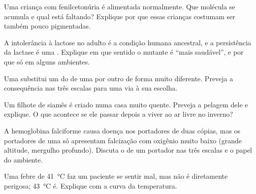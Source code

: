 \begin{exercise}[$\star\star$]\label{exo:g11:enzymes-and-phenotype:8}
Uma criança com fenilcetonúria é alimentada normalmente. Que molécula
se acumula e qual está faltando? Explique por que essas crianças
costumam ser também pouco pigmentadas.
\end{exercise}

\begin{exercise}[$\star\star$]\label{exo:g11:enzymes-and-phenotype:9}
A intolerância à lactose no adulto é a condição humana ancestral, e a
persistência da lactase é uma . Explique em que sentido o
 mutante é ``mais saudável'', e por que só em alguns ambientes.
\end{exercise}

\begin{exercise}[$\star\star$]\label{exo:g11:enzymes-and-phenotype:10}
Uma  substitui um  do  de uma  por
outro de forma muito diferente. Preveja a consequência nas três escalas
para uma via à sua escolha.
\end{exercise}

\begin{exercise}[$\star\star$]\label{exo:g11:enzymes-and-phenotype:11}
Um filhote de siamês é criado numa casa muito quente. Preveja a
pelagem dele e explique. O que acontece se ele passar depois a viver
ao ar livre no inverno?
\end{exercise}

\begin{exercise}[$\star\star\star$]\label{exo:g11:enzymes-and-phenotype:12}
A hemoglobina falciforme causa doença nos portadores de duas cópias,
mas os portadores de uma só apresentam falcização com oxigênio muito
baixo (grande altitude, mergulho profundo). Discuta o  de um
portador nas três escalas e o papel do ambiente.
\end{exercise}

\begin{exercise}[$\star\star\star$]\label{exo:g11:enzymes-and-phenotype:13}
Uma febre de \qty{41}{\celsius} faz um paciente se sentir mal, mas não
é diretamente perigosa; \qty{43}{\celsius} é. Explique com a curva da
temperatura.
\end{exercise}

